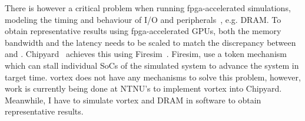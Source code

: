 There is however a critical problem when running \acrshort{fpga}-accelerated simulations, modeling the timing and behaviour of I/O and peripherals~\cite{chipyard}, e.g. DRAM. To obtain representative results using \acrshort{fpga}-accelerated GPUs, both the memory bandwidth and the latency needs to be scaled to match the discrepancy between  and . Chipyard~\cite{chipyard} achieves this using Firesim~\cite{firesim}. Firesim, use a token mechanism which can stall individual SoCs of the simulated system to advance the system in target time. \Gls{vortex} does not have any mechanisms to solve this problem, however, work is currently being done at NTNU's  to implement \Gls{vortex} into Chipyard. Meanwhile, I have to simulate \Gls{vortex} and DRAM in software to obtain representative results.


